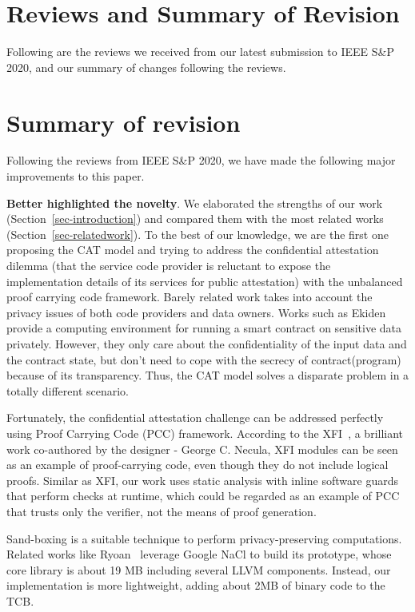 \section*{Reviews and Summary of Revision}

\noindent Following are the reviews we received from our latest submission to IEEE S\&P 2020, and our summary of changes following the reviews.

\section{Summary of revision}
Following the reviews from IEEE S\&P 2020, we have made the following major improvements to this paper.


\vspace{3pt}\noindent\textbf{Better highlighted the novelty}.
We elaborated the strengths of our work (Section~\ref{sec-introduction}) and compared them with the most related works (Section~\ref{sec-relatedwork}). To the best of our knowledge, we are the first one proposing the CAT model and trying to address the confidential attestation dilemma (that the service code provider is reluctant to expose the implementation details of its services for public attestation) with the unbalanced proof carrying code framework. Barely related work takes into account the privacy issues of both code providers and data owners. Works such as Ekiden~\cite{cheng2018ekiden} provide a computing environment for running a smart contract on sensitive data privately. However, they only care about the confidentiality of the input data and the contract state, but don't need to cope with the secrecy of contract(program) because of its transparency. Thus, the CAT model solves a disparate problem in a totally different scenario.

Fortunately, the confidential attestation challenge can be addressed perfectly using Proof Carrying Code (PCC) framework.
According to the XFI~\cite{erlingsson2006xfi}, a brilliant work co-authored by the designer -  George C. Necula, XFI modules can be seen as an example of proof-carrying code, even though they do not include logical proofs. Similar as XFI, our work uses static analysis with inline software guards that perform checks at runtime, which could be regarded as an example of PCC that trusts only the verifier, not the means of proof generation.

Sand-boxing is a suitable technique to perform privacy-preserving computations. Related works like Ryoan~\cite{hunt2018ryoan} leverage Google NaCl to build its prototype, whose core library is about 19 MB including several LLVM components. Instead, our implementation is more lightweight, adding about 2MB of binary code to the TCB.

